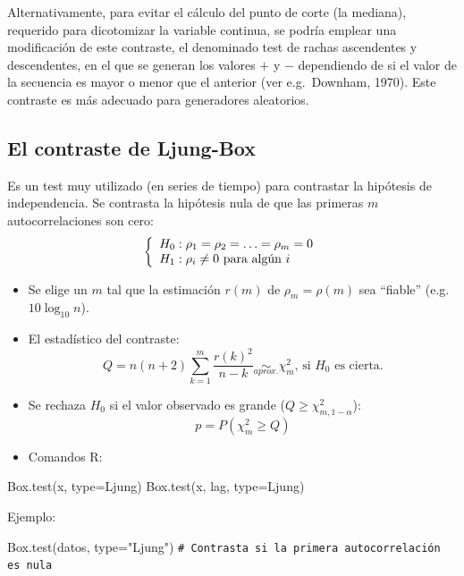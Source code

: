 \documentclass[
]{book}
\newenvironment{Shaded}{\begin{snugshade}}{\end{snugshade}}
\newcommand{\AttributeTok}[1]{\textcolor[rgb]{0.77,0.63,0.00}{#1}}
\newcommand{\CommentTok}[1]{\textcolor[rgb]{0.56,0.35,0.01}{\textit{#1}}}
\newcommand{\FunctionTok}[1]{\textcolor[rgb]{0.00,0.00,0.00}{#1}}
\newcommand{\NormalTok}[1]{#1}
\newcommand{\StringTok}[1]{\textcolor[rgb]{0.31,0.60,0.02}{#1}}
\theoremstyle{break}
\theoremstyle{nonumberplain}
\renewcommand{\CommentTok}[1]{\textcolor[rgb]{0.41,0.41,0.41}{\texttt{#1}}}
\begin{document}
Alternativamente, para evitar el cálculo del punto de corte (la mediana), requerido para dicotomizar la variable continua, se podría emplear una modificación de este contraste, el denominado test de rachas ascendentes y descendentes, en el que se generan los valores \(+\) y \(-\) dependiendo de si el valor de la secuencia es mayor o menor que el anterior (ver e.g.~Downham, 1970). Este contraste es más adecuado para generadores aleatorios.

\hypertarget{el-contraste-de-ljung-box}{%
\subsection{El contraste de Ljung-Box}\label{el-contraste-de-ljung-box}}

Es un test muy utilizado (en series de tiempo) para contrastar la
hipótesis de independencia.
Se contrasta la hipótesis nula de que las primeras \(m\)
autocorrelaciones son cero:
\[\left\{\begin{array}[c]{l}
    H_{0}:\rho_{1}=\rho_{2}=\ldots=\rho_{m}=0\\
    H_{1}:\rho_{i}\neq0\text{ para algún } i
\end{array}
\right.\]

\begin{itemize}
\item
  Se elige un \(m\) tal que la estimación \(r(m)\) de
  \(\rho_{m}=\rho(m)\) sea ``fiable'' (e.g.~\(10\log_{10}n\)).
\item
  El estadístico del contraste:
  \[Q=n(n+2)\sum_{k=1}^{m}\frac{r(k)^{2}}{n-k}\underset{aprox.}{\sim}\chi
  _{m}^{2}\text{, si }H_{0}\text{ es cierta.}\]
\item
  Se rechaza \(H_{0}\) si el valor observado es grande (\(Q\geq \chi_{m,1-\alpha}^{2}\)):
  \[p=P\left(  {\chi_{m}^{2}}\geq Q\right)\]
\item
  Comandos R:
\end{itemize}

\begin{Shaded}
\begin{Highlighting}[]
    \FunctionTok{Box.test}\NormalTok{(x, }\AttributeTok{type=}\NormalTok{Ljung)}
    \FunctionTok{Box.test}\NormalTok{(x, lag, }\AttributeTok{type=}\NormalTok{Ljung)}
\end{Highlighting}
\end{Shaded}

Ejemplo:

\begin{Shaded}
\begin{Highlighting}[]
\FunctionTok{Box.test}\NormalTok{(datos, }\AttributeTok{type=}\StringTok{"Ljung"}\NormalTok{) }\CommentTok{\# Contrasta si la primera autocorrelación es nula }
\end{Highlighting}
\end{Shaded}
\end{document}
